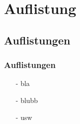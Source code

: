 
\chapter{Auflistung}

\section{Auflistungen}

\subsection{Auflistungen}


\begin{itemize}
	\item[-] bla
	\item[-] blubb
	\item[-] usw
\end{itemize}
